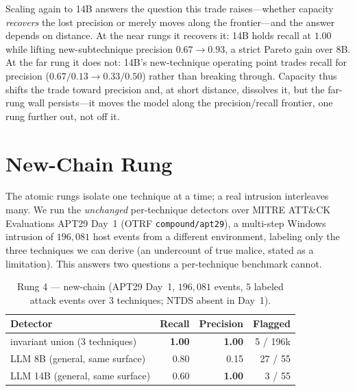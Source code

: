 \documentclass[sigconf,nonacm]{acmart}
\begin{document}
Scaling again to 14B answers the question this trade raises---whether capacity
\emph{recovers} the lost precision or merely moves along the frontier---and the
answer depends on distance. At the near rungs it recovers it: 14B holds recall
at $1.00$ while lifting new-subtechnique precision $0.67\!\rightarrow\!0.93$, a
strict Pareto gain over 8B. At the far rung it does not: 14B's new-technique
operating point trades recall for precision
($0.67/0.13\!\rightarrow\!0.33/0.50$) rather than breaking through. Capacity
thus shifts the trade toward precision and, at short distance, dissolves it, but
the far-rung wall persists---it moves the model along the precision/recall
frontier, one rung further out, not off it.

\section{New-Chain Rung}
\label{sec:chain}
The atomic rungs isolate one technique at a time; a real intrusion interleaves
many. We run the \emph{unchanged} per-technique detectors over MITRE ATT\&CK
Evaluations APT29 Day~1 (OTRF \texttt{compound/apt29}), a multi-step Windows
intrusion of $196{,}081$ host events from a different environment, labeling only
the three techniques we can derive (an undercount of true malice, stated as a
limitation). This answers two questions a per-technique benchmark cannot.

\begin{table}[t]
\caption{Rung 4 --- new-chain (APT29 Day~1, $196{,}081$ events, $5$ labeled
attack events over $3$ techniques; NTDS absent in Day~1).}
\label{tab:chain}
\small
\begin{tabular}{@{}lrrr@{}}
\toprule
Detector & Recall & Precision & Flagged \\
\midrule
invariant union (3 techniques)  & \textbf{1.00} & \textbf{1.00} & 5 / 196k \\
LLM 8B (general, same surface)  & 0.80 & 0.15 & 27 / 55 \\
LLM 14B (general, same surface) & 0.60 & \textbf{1.00} & 3 / 55 \\
\bottomrule
\end{tabular}
\end{table}
\end{document}
